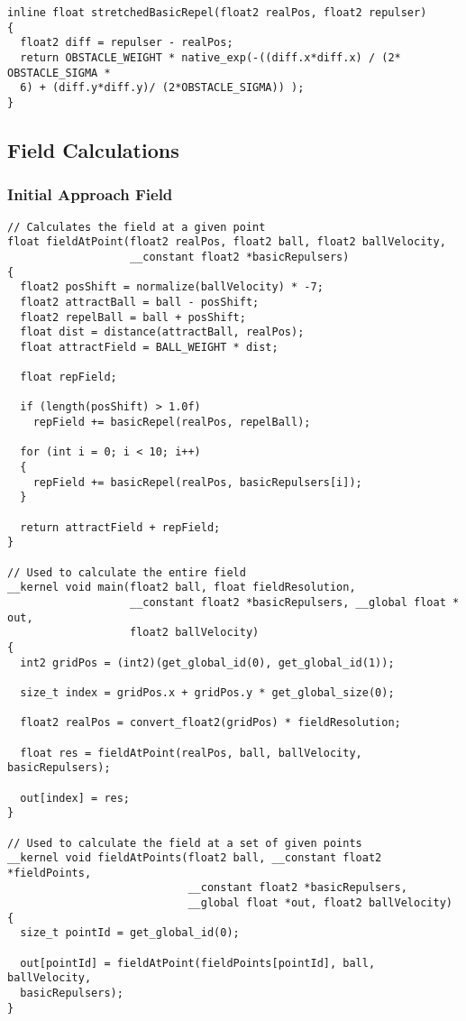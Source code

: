 \begin{lstlisting}
inline float stretchedBasicRepel(float2 realPos, float2 repulser)
{
  float2 diff = repulser - realPos;
  return OBSTACLE_WEIGHT * native_exp(-((diff.x*diff.x) / (2* OBSTACLE_SIGMA *
  6) + (diff.y*diff.y)/ (2*OBSTACLE_SIGMA)) ); 
}
\end{lstlisting}

\subsection{Field Calculations}

\subsubsection{Initial Approach Field\label{app:initialApproachField}}

\begin{lstlisting}
// Calculates the field at a given point
float fieldAtPoint(float2 realPos, float2 ball, float2 ballVelocity, 
                   __constant float2 *basicRepulsers)
{
  float2 posShift = normalize(ballVelocity) * -7;
  float2 attractBall = ball - posShift;
  float2 repelBall = ball + posShift;
  float dist = distance(attractBall, realPos);
  float attractField = BALL_WEIGHT * dist;

  float repField;

  if (length(posShift) > 1.0f)
    repField += basicRepel(realPos, repelBall);

  for (int i = 0; i < 10; i++)
  {
    repField += basicRepel(realPos, basicRepulsers[i]);
  }

  return attractField + repField;
}

// Used to calculate the entire field
__kernel void main(float2 ball, float fieldResolution, 
                   __constant float2 *basicRepulsers, __global float * out,
                   float2 ballVelocity) 
{
  int2 gridPos = (int2)(get_global_id(0), get_global_id(1));

  size_t index = gridPos.x + gridPos.y * get_global_size(0);

  float2 realPos = convert_float2(gridPos) * fieldResolution;

  float res = fieldAtPoint(realPos, ball, ballVelocity, basicRepulsers);

  out[index] = res;
}

// Used to calculate the field at a set of given points
__kernel void fieldAtPoints(float2 ball, __constant float2 *fieldPoints, 
                            __constant float2 *basicRepulsers, 
                            __global float *out, float2 ballVelocity) 
{
  size_t pointId = get_global_id(0);

  out[pointId] = fieldAtPoint(fieldPoints[pointId], ball, ballVelocity,
  basicRepulsers); 
}
\end{lstlisting}

